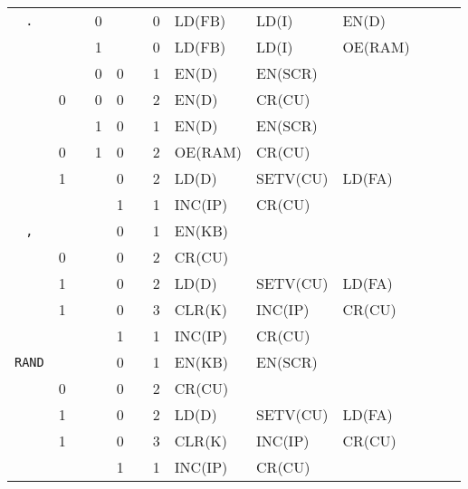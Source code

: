 \begin{longtable}[c] {c|ccccc|c|llllll}
    \rowcolor{Gray} \texttt{.}    &   &   & 0 &   &   & 0 & LD(FB)   & LD(I)    & EN(D)   &        &        &                  \\ 
    \rowcolor{White}              &   &   & 1 &   &   & 0 & LD(FB)   & LD(I)    & OE(RAM) &        &        &                 \\ 
    \rowcolor{Gray}               &   &   & 0 & 0 &   & 1 & EN(D)    & EN(SCR)  &         &        &        &                  \\
    \rowcolor{Gray}               & 0 &   & 0 & 0 &   & 2 & EN(D)    & CR(CU)   &         &        &        &                  \\
    \rowcolor{White}              &   &   & 1 & 0 &   & 1 & EN(D)    & EN(SCR)  &         &        &        &                  \\
    \rowcolor{White}              & 0 &   & 1 & 0 &   & 2 & OE(RAM)  & CR(CU)   &         &        &        &                  \\
    \rowcolor{Gray}               & 1 &   &   & 0 &   & 2 & LD(D)    & SETV(CU) & LD(FA)  &        &        &                  \\ 
    \rowcolor{White}               &   &   &   & 1 &   & 1 & INC(IP)  & CR(CU)   &         &        &        &                 \\ \hline
   
    \rowcolor{Gray} \texttt{,}    &   &   &   & 0     &      & 1     & EN(KB)   &          &         &        &        &        \\
    \rowcolor{Gray}               & 0 &   &   & 0     &      & 2     & CR(CU)   &          &         &        &        &        \\
    \rowcolor{White}              & 1 &   &   & 0     &      & 2     & LD(D)   & SETV(CU) & LD(FA)   &        &        &        \\    
    \rowcolor{White}              & 1 &   &   & 0     &      & 3     & CLR(K)  & INC(IP) & CR(CU) &   &     &        \\
    \rowcolor{Gray}              &   &   &   & 1     &      & 1     & INC(IP)  & CR(CU)   &         &        &        &        \\ \hline


    \rowcolor{Gray} \texttt{RAND}  &   &   &   & 0     &      & 1     & EN(KB)   & EN(SCR) &         &        &        &        \\
    \rowcolor{Gray}               & 0 &   &   & 0     &      & 2     & CR(CU)   &          &         &        &        &        \\
    \rowcolor{White}              & 1 &   &   & 0     &      & 2     & LD(D)   & SETV(CU) & LD(FA)   &        &        &        \\    
    \rowcolor{White}              & 1 &   &   & 0     &      & 3     & CLR(K)  & INC(IP) & CR(CU) &   &     &        \\
    \rowcolor{Gray}              &   &   &   & 1     &      & 1     & INC(IP)  & CR(CU)   &         &        &        &        \\ \hline
    


\end{longtable}
